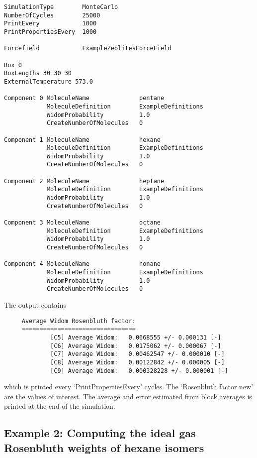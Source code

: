 \begin{tiny}
\begin{verbatim}
SimulationType        MonteCarlo
NumberOfCycles        25000
PrintEvery            1000
PrintPropertiesEvery  1000

Forcefield            ExampleZeolitesForceField

Box 0
BoxLengths 30 30 30
ExternalTemperature 573.0

Component 0 MoleculeName              pentane
            MoleculeDefinition        ExampleDefinitions
            WidomProbability          1.0
            CreateNumberOfMolecules   0

Component 1 MoleculeName              hexane
            MoleculeDefinition        ExampleDefinitions
            WidomProbability          1.0
            CreateNumberOfMolecules   0

Component 2 MoleculeName              heptane
            MoleculeDefinition        ExampleDefinitions
            WidomProbability          1.0
            CreateNumberOfMolecules   0

Component 3 MoleculeName              octane
            MoleculeDefinition        ExampleDefinitions
            WidomProbability          1.0
            CreateNumberOfMolecules   0

Component 4 MoleculeName              nonane
            MoleculeDefinition        ExampleDefinitions
            WidomProbability          1.0
            CreateNumberOfMolecules   0
\end{verbatim}
\end{tiny}
\noindent
The output contains
\begin{tiny}
\begin{verbatim}
     Average Widom Rosenbluth factor:
     ================================
             [C5] Average Widom:   0.0668555 +/- 0.000131 [-]
             [C6] Average Widom:   0.0175062 +/- 0.000067 [-]
             [C7] Average Widom:   0.00462547 +/- 0.000010 [-]
             [C8] Average Widom:   0.00122842 +/- 0.000005 [-]
             [C9] Average Widom:   0.000328228 +/- 0.000001 [-]
\end{verbatim}
\end{tiny}
which is printed every `PrintPropertiesEvery' cycles. The `Rosenbluth factor new' are the values of interest.
The average and error estimated from block averages is printed at the end
of the simulation.

\subsection*{Example 2: Computing the ideal gas Rosenbluth weights of hexane isomers}

